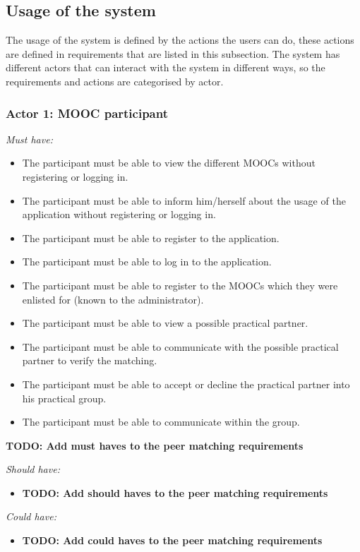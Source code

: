 \documentclass[]{article}
\newcommand{\TODO}[1]{{\color{red}\textbf{TODO: #1}}}
\newcommand{\reqr}[1]{{\noindent\emph{#1:}}}
\begin{document}
\subsection{Usage of the system}
The usage of the system is defined by the actions the users can do, these actions are defined in requirements that are listed in this subsection.
The system has different actors that can interact with the system in different ways, so the requirements and actions are categorised by actor.

\subsubsection{Actor 1: MOOC participant}

\reqr{Must have}
\begin{itemize}
\item The participant must be able to view the different MOOCs without registering or logging in.
\item The participant must be able to inform him/herself about the usage of the application without registering or logging in.
\item The participant must be able to register to the application.
\item The participant must be able to log in to the application.
\item The participant must be able to register to the MOOCs which they were enlisted for (known to the administrator).
\item The participant must be able to view a possible practical partner.
\item The participant must be able to communicate with the possible practical partner to verify the matching.
\item The participant must be able to accept or decline the practical partner into his practical group.
\item The participant must be able to communicate within the group.
\end{itemize}
\TODO{Add must haves to the peer matching requirements}

\reqr{Should have}
\begin{itemize}
\item \TODO{Add should haves to the peer matching requirements}
\end{itemize}

\reqr{Could have}
\begin{itemize}
\item \TODO{Add could haves to the peer matching requirements}
\end{itemize}
\end{document}
